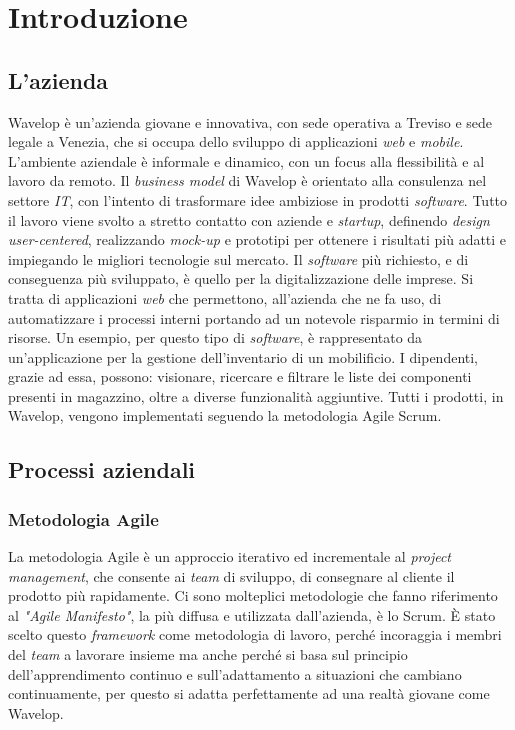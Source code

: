 
\chapter{Introduzione}
\label{cap:intro}
\section{L'azienda}
Wavelop è un'azienda giovane e innovativa, con sede operativa a Treviso e sede legale a Venezia, che si occupa dello sviluppo di applicazioni \emph{web} e \emph{mobile}.
L'ambiente aziendale è informale e dinamico, con un focus alla flessibilità e al lavoro da remoto.
Il \emph{business model} di Wavelop è orientato alla consulenza nel settore \emph{IT}, con l'intento di trasformare idee ambiziose in prodotti \emph{software}.
Tutto il lavoro viene svolto a stretto contatto con aziende e \emph{startup}, definendo \emph{design user-centered}, realizzando \emph{\gls{mock-up}} e prototipi per ottenere i risultati più adatti e impiegando le migliori tecnologie sul mercato.
Il \emph{software} più richiesto, e di conseguenza più sviluppato, è quello per la digitalizzazione delle imprese. 
Si tratta di applicazioni \emph{web} che permettono, all'azienda che ne fa uso, di automatizzare i processi interni portando ad un notevole risparmio in termini di risorse.
Un esempio, per questo tipo di \emph{software}, è rappresentato da un'applicazione per la gestione dell'inventario di un mobilificio.
I dipendenti, grazie ad essa, possono: visionare, ricercare e filtrare le liste dei componenti presenti in magazzino, oltre a diverse funzionalità aggiuntive.
Tutti i prodotti, in Wavelop, vengono implementati seguendo la metodologia Agile Scrum.

\section{Processi aziendali}

\subsection{Metodologia Agile}
La metodologia Agile è un approccio iterativo ed incrementale al \emph{project management}, che consente ai \emph{team} di sviluppo, di consegnare al cliente il prodotto più rapidamente.
Ci sono molteplici metodologie che fanno riferimento al \emph{"Agile Manifesto"}, la più diffusa e utilizzata dall'azienda, è lo Scrum.
È stato scelto questo \emph{framework} come metodologia di lavoro, perché incoraggia i membri del \emph{team} a lavorare insieme ma anche perché si basa sul principio dell'apprendimento continuo e sull'adattamento a situazioni che cambiano continuamente, per questo si adatta perfettamente ad una realtà giovane come Wavelop. \\


